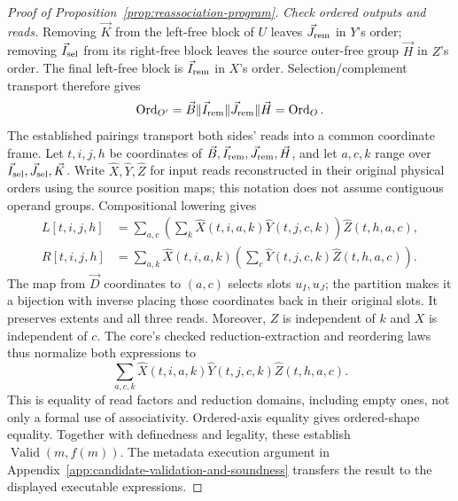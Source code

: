 \begin{proof}[Proof of Proposition~\ref{prop:reassociation-program}]
\emph{Check ordered outputs and reads.}
Removing $\vec K$ from the left-free block of $U$ leaves $\vec J_{\mathrm{rem}}$ in $Y$'s
order; removing $\vec I_{\mathrm{sel}}$ from its right-free block leaves the source
outer-free group $\vec H$ in $Z$'s order. The final left-free block is $\vec I_{\mathrm{rem}}$
in $X$'s order. Selection/complement transport therefore gives
\begin{equation}
 \operatorname{Ord}_{O'}=\vec B\Vert\vec I_{\mathrm{rem}}\Vert\vec J_{\mathrm{rem}}\Vert \vec H=\operatorname{Ord}_O.
 \label{eq:reassociation-output-proof}
\end{equation}
The established pairings transport both sides' reads into a common
coordinate frame. Let $t,i,j,h$ be coordinates of
$\vec B,\vec I_{\mathrm{rem}},\vec J_{\mathrm{rem}},\vec H$, and let $a,c,k$ range over
$\vec I_{\mathrm{sel}},\vec J_{\mathrm{sel}},\vec K$. Write $\widehat X,\widehat Y,\widehat Z$ for input
reads reconstructed in their original physical orders using the source
position maps; this notation does not assume contiguous operand groups.
Compositional lowering gives
\begin{equation}
\begin{aligned}
 L[t,i,j,h]
 &=\sum_{a,c}\left(\sum_k
       \widehat X(t,i,a,k)\widehat Y(t,j,c,k)\right)
       \widehat Z(t,h,a,c),\\
 R[t,i,j,h]
 &=\sum_{a,k}\widehat X(t,i,a,k)
       \left(\sum_c\widehat Y(t,j,c,k)\widehat Z(t,h,a,c)\right).
\end{aligned}
\label{eq:reassociation-lowered}
\end{equation}
The map from $\vec D$ coordinates to $(a,c)$ selects slots $u_I,u_J$;
the partition makes it a bijection with inverse placing those coordinates
back in their original slots. It preserves extents and all three reads.
Moreover, $Z$ is independent of $k$ and $X$ is independent of $c$.
The core's checked reduction-extraction and reordering laws thus normalize
both expressions to
\begin{equation}
 \sum_{a,c,k}\widehat X(t,i,a,k)
                 \widehat Y(t,j,c,k)\widehat Z(t,h,a,c).
 \label{eq:reassociation-common-normal-form}
\end{equation}
This is equality of read factors and reduction domains, including empty
ones, not only a formal use of associativity. Ordered-axis equality gives
ordered-shape equality. Together with definedness and legality, these establish
$\operatorname{Valid}(m,f(m))$. The metadata execution argument in
Appendix~\ref{app:candidate-validation-and-soundness} transfers the result to the
displayed executable expressions.
\end{proof}
